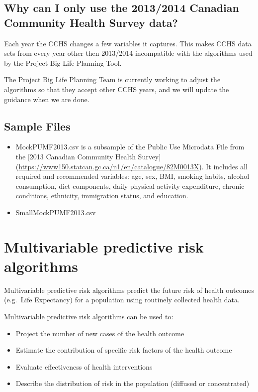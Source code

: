 \documentclass[]{book}
\providecommand{\tightlist}{%
  \setlength{\itemsep}{0pt}\setlength{\parskip}{0pt}}
\begin{document}
\subsection{Why can I only use the 2013/2014 Canadian Community Health
Survey
data?}\label{why-can-i-only-use-the-20132014-canadian-community-health-survey-data}

Each year the CCHS changes a few variables it captures. This makes CCHS
data sets from every year other then 2013/2014 incompatible with the
algorithms used by the Project Big Life Planning Tool.

The Project Big Life Planning Team is currently working to adjust the
algorithms so that they accept other CCHS years, and we will update the
guidance when we are done.

\subsection{Sample Files}\label{sample-files}

\begin{itemize}
\item
  MockPUMF2013.csv is a subsample of the Public Use Microdata File from
  the {[}2013 Canadian Community Health Survey{]}
  (\url{https://www150.statcan.gc.ca/n1/en/catalogue/82M0013X}). It
  includes all required and recommended variables: age, sex, BMI,
  smoking habits, alcohol consumption, diet components, daily physical
  activity expenditure, chronic conditions, ethnicity, immigration
  status, and education.
\item
  SmallMockPUMF2013.csv
\end{itemize}

\section{Multivariable predictive risk
algorithms}\label{multivariable-predictive-risk-algorithms}

Multivariable predictive risk algorithms predict the future risk of
health outcomes (e.g.~Life Expectancy) for a population using routinely
collected health data.

Multivariable predictive risk algorithms can be used to:

\begin{itemize}
\tightlist
\item
  Project the number of new cases of the health outcome
\item
  Estimate the contribution of specific risk factors of the health
  outcome
\item
  Evaluate effectiveness of health interventions
\item
  Describe the distribution of risk in the population (diffused or
  concentrated)
\end{itemize}
\end{document}

